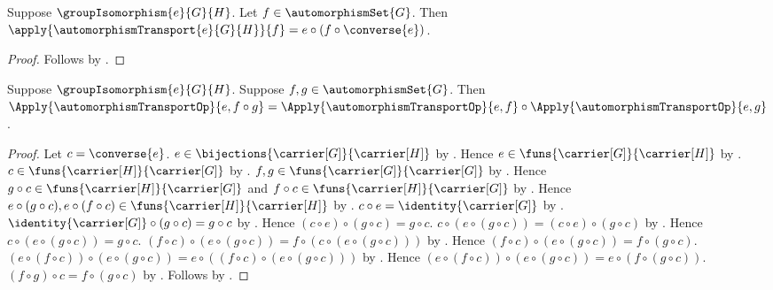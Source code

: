 \begin{proposition}\label{automorphism_transport_apply}
    Suppose $\groupIsomorphism{e}{G}{H}$.
    Let $f\in\automorphismSet{G}$.
    Then
        $\apply{\automorphismTransport{e}{G}{H}}{f}=
            e\circ(f\circ\converse{e})$.
\end{proposition}
\begin{proof}
    Follows by
        .
\end{proof}

\begin{lemma}\label{automorphism_transport_op_mul}
    Suppose $\groupIsomorphism{e}{G}{H}$.
    Suppose $f,g\in\automorphismSet{G}$.
    Then
        $\Apply{\automorphismTransportOp}{e,f\circ g}=
            \Apply{\automorphismTransportOp}{e,f}
                \circ
            \Apply{\automorphismTransportOp}{e,g}$.
\end{lemma}
\begin{proof}
    Let $c=\converse{e}$.
    $e\in\bijections{\carrier[G]}{\carrier[H]}$ by
        .
    Hence $e\in\funs{\carrier[G]}{\carrier[H]}$ by
        .
    $c\in\funs{\carrier[H]}{\carrier[G]}$ by
        .
    $f,g\in\funs{\carrier[G]}{\carrier[G]}$ by
        .
    Hence $g\circ c\in\funs{\carrier[H]}{\carrier[G]}$ and
        $f\circ c\in\funs{\carrier[H]}{\carrier[G]}$ by
        .
    Hence $e\circ(g\circ c),e\circ(f\circ c)\in
        \funs{\carrier[H]}{\carrier[H]}$ by
        .
    $c\circ e=\identity{\carrier[G]}$ by
        .
    $\identity{\carrier[G]}\circ(g\circ c)=g\circ c$ by
        .
    Hence $(c\circ e)\circ(g\circ c)=g\circ c$.
    $c\circ(e\circ(g\circ c))=(c\circ e)\circ(g\circ c)$ by
        .
    Hence $c\circ(e\circ(g\circ c))=g\circ c$.
    $(f\circ c)\circ(e\circ(g\circ c))=
        f\circ(c\circ(e\circ(g\circ c)))$ by
        .
    Hence
        $(f\circ c)\circ(e\circ(g\circ c))=f\circ(g\circ c)$.
    $(e\circ(f\circ c))\circ(e\circ(g\circ c))=
        e\circ((f\circ c)\circ(e\circ(g\circ c)))$ by
        .
    Hence
        $(e\circ(f\circ c))\circ(e\circ(g\circ c))=
            e\circ(f\circ(g\circ c))$.
    $(f\circ g)\circ c=f\circ(g\circ c)$ by
        .
    Follows by .
\end{proof}

